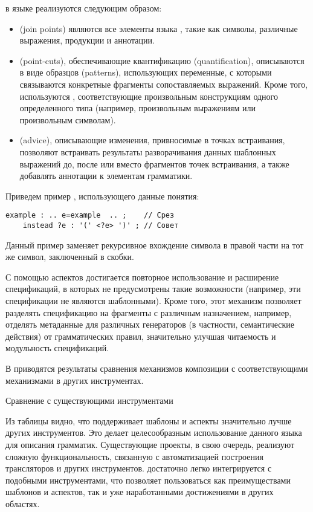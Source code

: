  в языке \GRM{} реализуются следующим образом:
\begin{itemize}
\item {} (join points) являются все элементы языка \GRM{}, такие как символы, различные выражения, продукции и аннотации.
\item {} (point-cuts), обеспечивающие квантификацию (quantification), описываются в виде образцов (patterns), использующих переменные, с которыми связываются конкретные фрагменты сопоставляемых выражений. Кроме того, используются , соответствующие произвольным конструкциям одного определенного типа (например, произвольным выражениям или произвольным символам).
\item {} (advice), описывающие изменения, привносимые в точках встраивания, позволяют встраивать результаты разворачивания данных шаблонных выражений до, после или вместо фрагментов точек встраивания, а также добавлять аннотации к элементам грамматики.
\end{itemize}
Приведем пример , использующего данные понятия:
\begin{lstlisting}
example : .. e=example  .. ;    // Срез
	instead ?e : '(' <?e> ')' ; // Совет
\end{lstlisting}
Данный пример заменяет рекурсивное вхождение символа  в правой части на тот же символ, заключенный в скобки.

С помощью аспектов достигается повторное использование  и расширение спецификаций, в которых не предусмотрены такие возможности (например, эти спецификации не являются шаблонными). Кроме того, этот механизм позволяет разделять спецификацию на фрагменты с различным назначением, например, отделять метаданные для различных генераторов (в частности, семантические действия) от грамматических правил, значительно улучшая читаемость и модульность спецификаций.

В  приводятся результаты сравнения механизмов композиции \GRM{} с соответствующими механизмами в других инструментах.
\begin{table}[htb]
	\centering
\newcommand{\dissonly}[1]{}

	\caption{Сравнение \GRM{} с существующими инструментами}\label{GrmTable}
\end{table}
Из таблицы видно, что \GRM{} поддерживает шаблоны и аспекты значительно лучше других инструментов. Это делает целесообразным использование данного языка для описания грамматик. Существующие проекты, в свою очередь, реализуют сложную функциональность, связанную с автоматизацией построения трансляторов и других инструментов. \GRM{} достаточно легко интегрируется с подобными инструментами, что позволяет пользоваться как преимуществами шаблонов и аспектов, так и уже наработанными достижениями в других областях. 

